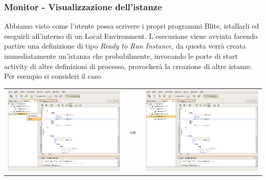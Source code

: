 \newpage

\subsubsection*{Monitor - Visualizzazione dell'istanze}

Abbiamo visto come l'utente possa scrivere i propri programmi Blite, istallarli
ed eseguirli all'interno di un Local Environment. L'esecuzione viene avviata
facendo partire una definizione di tipo \emph{Ready to Run Instance}, da
questa verrà creata immediatamente un'istanza che probabilmente, invocando le
porte di start activity di altre definizioni di processo, provocherà la
creazione di altre istanze. Per esempio si consideri il caso

\vspace{0.5cm}
\begin{center}
\begin{tabular}{ccc}
\includegraphics[scale=0.75]{blide/dia/BlideMon1} 
& $\Rightarrow$
& \includegraphics[scale=0.75]{blide/dia/BlideMon2}    
\end{tabular}
\end{center}
\vspace{0.5cm}

